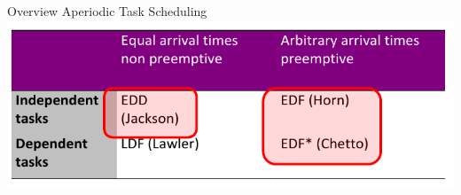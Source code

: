 \begin{frame}{Overview Aperiodic Task Scheduling}
  \centering
  \includegraphics[width=\textwidth]{./figures/overview_aperiodic_task_scheduling.png}
\end{frame}

%

